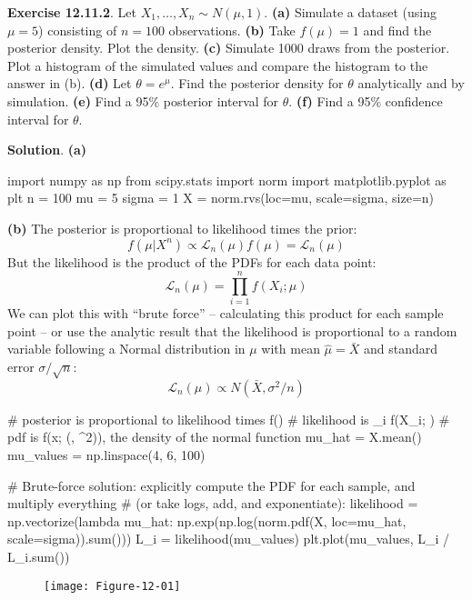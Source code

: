 \textbf{Exercise 12.11.2}. Let \(X_{1}, \dots, X_{n} \sim N(\mu, 1)\).
\textbf{(a)} Simulate a dataset (using \(\mu = 5\)) consisting of
\(n = 100\) observations.
\textbf{(b)} Take \(f(\mu) = 1\) and find the posterior density. Plot
the density.
\textbf{(c)} Simulate 1000 draws from the posterior. Plot a histogram of
the simulated values and compare the histogram to the answer in (b).
\textbf{(d)} Let \(\theta = e^\mu\). Find the posterior density for
\(\theta\) analytically and by simulation.
\textbf{(e)} Find a 95\% posterior interval for \(\theta\).
\textbf{(f)} Find a 95\% confidence interval for \(\theta\).

\textbf{Solution}.
\textbf{(a)}

\begin{python}
import numpy as np
from scipy.stats import norm
import matplotlib.pyplot as plt
n = 100
mu = 5
sigma = 1
X = norm.rvs(loc=mu, scale=sigma, size=n)
\end{python}
\textbf{(b)} The posterior is proportional to likelihood times the
prior:
\[
f(\mu | X^{n}) \propto \mathcal{L}_{n}(\mu) f(\mu) = \mathcal{L}_{n}(\mu)
\]
But the likelihood is the product of the PDFs for each data point:
\[
\mathcal{L}_{n}(\mu) = \prod_{i=1}^{n} f(X_{i}; \mu)
\]
We can plot this with ``brute force'' -- calculating this product for
each sample point -- or use the analytic result that the likelihood is
proportional to a random variable following a Normal distribution in
\(\mu\) with mean \(\hat{\mu} = \bar{X}\) and standard error
\(\sigma / \sqrt{n}\):
\[
\mathcal{L}_{n}(\mu) \propto N(\bar{X}, \sigma^{2} / n)
\]

\begin{python}
# posterior is proportional to likelihood times f(\mu)
# likelihood is \prod_{i} f(X_{i}; \mu)
# pdf is f(x; (\mu, \sigma^{2})), the density of the normal function
mu_hat = X.mean()
mu_values = np.linspace(4, 6, 100)
\end{python}

\begin{python}
# Brute-force solution: explicitly compute the PDF for each sample, and multiply everything 
# (or take logs, add, and exponentiate):
likelihood = np.vectorize(lambda mu_hat: np.exp(np.log(norm.pdf(X, 
                                                loc=mu_hat,
                                                scale=sigma)).sum()))
L_i = likelihood(mu_values)
plt.plot(mu_values, L_i / L_i.sum())
\end{python}

\begin{figure}[H]
\centering
\texttt{[image: Figure-12-01]}
\end{figure}


